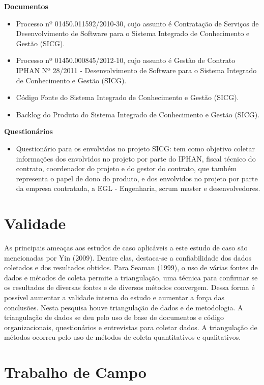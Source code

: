 \textbf{Documentos}
\begin{itemize}
\item Processo nº 01450.011592/2010-30, cujo assunto é Contratação de Serviços de Desenvolvimento de Software para o Sistema Integrado de Conhecimento e Gestão (SICG). 
\item Processo nº 01450.000845/2012-10, cujo assunto é Gestão de Contrato IPHAN Nº 28/2011 - Desenvolvimento de Software para o Sistema Integrado de Conhecimento e Gestão (SICG). 
\item Código Fonte do Sistema Integrado de Conhecimento e Gestão (SICG).
\item Backlog do Produto do Sistema Integrado de Conhecimento e Gestão (SICG).
\end{itemize}

\textbf{Questionários}
\begin{itemize}
\item Questionário para os envolvidos no projeto SICG: tem como objetivo coletar informações dos envolvidos no projeto por parte do IPHAN,  fiscal técnico do contrato, coordenador do projeto e do gestor do contrato, que também representa o papel de dono do produto, e dos envolvidos no projeto por parte da empresa contratada, a EGL - Engenharia, scrum master e desenvolvedores.
\end{itemize}

\section[Validade]{Validade}

As principais ameaças aos estudos de caso aplicáveis a este estudo de caso
são mencionadas por Yin (2009). Dentre elas, destaca-se a confiabilidade dos dados
coletados e dos resultados obtidos. Para Seaman (1999), o uso de várias fontes de dados
e métodos de coleta permite a triangulação, uma técnica para confirmar se os resultados
de diversas fontes e de diversos métodos convergem. Dessa forma é possível aumentar a
validade interna do estudo e aumentar a força das conclusões. Nesta pesquisa houve
triangulação de dados  e de metodologia. A triangulação de dados se deu
pelo uso de base de documentos e código organizacionais, questionários e entrevistas para coletar dados. A triangulação
de métodos ocorreu pelo uso de métodos de coleta quantitativos e qualitativos.


\section[Trabalho de Campo]{Trabalho de Campo}

